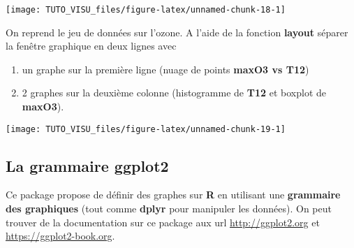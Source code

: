 \documentclass[]{article}
\newenvironment{Shaded}{\begin{snugshade}}{\end{snugshade}}
\newcommand{\DataTypeTok}[1]{\textcolor[rgb]{0.13,0.29,0.53}{#1}}
\newcommand{\DecValTok}[1]{\textcolor[rgb]{0.00,0.00,0.81}{#1}}
\newcommand{\KeywordTok}[1]{\textcolor[rgb]{0.13,0.29,0.53}{\textbf{#1}}}
\newcommand{\NormalTok}[1]{#1}
\newcommand{\OperatorTok}[1]{\textcolor[rgb]{0.81,0.36,0.00}{\textbf{#1}}}
\newcommand{\OtherTok}[1]{\textcolor[rgb]{0.56,0.35,0.01}{#1}}
\newcommand{\StringTok}[1]{\textcolor[rgb]{0.31,0.60,0.02}{#1}}
\providecommand{\tightlist}{%
  \setlength{\itemsep}{0pt}\setlength{\parskip}{0pt}}
\theoremstyle{definition}
\theoremstyle{definition}
\theoremstyle{definition}
\theoremstyle{remark}
\let\BeginKnitrBlock\begin \let\EndKnitrBlock\end
\begin{document}
\begin{center}\texttt{[image: TUTO\_VISU\_files/figure-latex/unnamed-chunk-18-1]} \end{center}

\BeginKnitrBlock{exercise}[Layout]
\protect\hypertarget{exr:exo4}{}{\label{exr:exo4} \iffalse (Layout) \fi{} }On reprend le jeu de données sur l'ozone. A l'aide de la fonction \textbf{layout} séparer la fenêtre graphique en deux lignes avec
\EndKnitrBlock{exercise}

\begin{enumerate}
\def\labelenumi{\arabic{enumi}.}
\tightlist
\item
  un graphe sur la première ligne (nuage de points \textbf{maxO3 vs T12})
\item
  2 graphes sur la deuxième colonne (histogramme de \textbf{T12} et boxplot de \textbf{maxO3}).
\end{enumerate}

\begin{Shaded}
\end{Shaded}

\begin{center}\texttt{[image: TUTO\_VISU\_files/figure-latex/unnamed-chunk-19-1]} \end{center}

\hypertarget{la-grammaire-ggplot2}{%
\subsection{\texorpdfstring{La grammaire \textbf{ggplot2}}{La grammaire ggplot2}}\label{la-grammaire-ggplot2}}

Ce package propose de définir des graphes sur \textbf{R} en utilisant une \textbf{grammaire des graphiques} (tout comme \textbf{dplyr} pour manipuler les données). On peut trouver de la documentation sur ce package aux url \url{http://ggplot2.org} et \url{https://ggplot2-book.org}.
\end{document}
